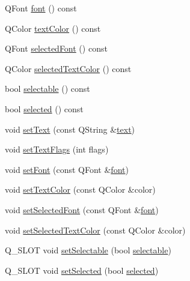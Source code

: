 \begin{DoxyCompactItemize}
\item 
Q\+Font \mbox{\hyperlink{class_q_c_p_text_element_a9247189a1c2b2bf5604645a7396b2ddc}{font}} () const
\item 
Q\+Color \mbox{\hyperlink{class_q_c_p_text_element_a4b906c81abb94517500dbdb2fe9c22b9}{text\+Color}} () const
\item 
Q\+Font \mbox{\hyperlink{class_q_c_p_text_element_a7119d960bdf57df74f9bcc748d2a0b43}{selected\+Font}} () const
\item 
Q\+Color \mbox{\hyperlink{class_q_c_p_text_element_a98616fa5c33f1eaee0428191ece39686}{selected\+Text\+Color}} () const
\item 
bool \mbox{\hyperlink{class_q_c_p_text_element_a96e2a712fca40324a8489f75833b4096}{selectable}} () const
\item 
bool \mbox{\hyperlink{class_q_c_p_text_element_a135d1ad0aa97a245b4247c3292ff551c}{selected}} () const
\item 
void \mbox{\hyperlink{class_q_c_p_text_element_ac44b81e69e719b879eb2feecb33557e2}{set\+Text}} (const Q\+String \&\mbox{\hyperlink{class_q_c_p_text_element_a453c24723b76fdcae405a8a7b0d02614}{text}})
\item 
void \mbox{\hyperlink{class_q_c_p_text_element_ab908f437f552020888a3ad8cf8242605}{set\+Text\+Flags}} (int flags)
\item 
void \mbox{\hyperlink{class_q_c_p_text_element_a09b3241769528fa87cb4bf35c97defad}{set\+Font}} (const Q\+Font \&\mbox{\hyperlink{class_q_c_p_text_element_a9247189a1c2b2bf5604645a7396b2ddc}{font}})
\item 
void \mbox{\hyperlink{class_q_c_p_text_element_a4f3b8361c3ffb3f84346954929ce93ba}{set\+Text\+Color}} (const Q\+Color \&color)
\item 
void \mbox{\hyperlink{class_q_c_p_text_element_a0a2397a3c4ede519e16ab3e991904065}{set\+Selected\+Font}} (const Q\+Font \&\mbox{\hyperlink{class_q_c_p_text_element_a9247189a1c2b2bf5604645a7396b2ddc}{font}})
\item 
void \mbox{\hyperlink{class_q_c_p_text_element_abaec200cae70a0eade53583defc0476d}{set\+Selected\+Text\+Color}} (const Q\+Color \&color)
\item 
Q\+\_\+\+S\+L\+OT void \mbox{\hyperlink{class_q_c_p_text_element_a3c5f9b1897a036b16495ed3fb8371c55}{set\+Selectable}} (bool \mbox{\hyperlink{class_q_c_p_text_element_a96e2a712fca40324a8489f75833b4096}{selectable}})
\item 
Q\+\_\+\+S\+L\+OT void \mbox{\hyperlink{class_q_c_p_text_element_aba5521f9fb22a5f3d2f09ab37d4a1751}{set\+Selected}} (bool \mbox{\hyperlink{class_q_c_p_text_element_a135d1ad0aa97a245b4247c3292ff551c}{selected}})

\end{DoxyCompactItemize}
